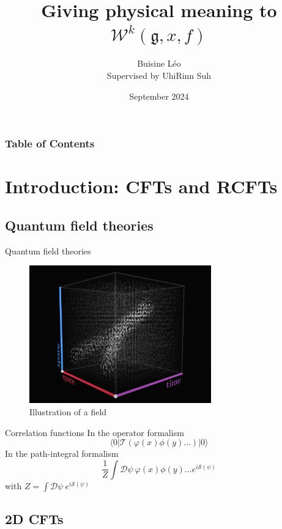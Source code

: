 \documentclass{beamer}
\title{Giving physical meaning to $\mathcal{W}^k(\mathfrak{g}, x, f)$}
\author{Buisine Léo \\ Supervised by UhiRinn Suh}
\institute{\textit{Ecole Normale Superieure of Paris}\\ \textit{Seoul National University}}
\date{September 2024}
\begin{document}
\frame{\titlepage}

\begin{frame}
\frametitle{Table of Contents}
\tableofcontents
\end{frame}


\section{Introduction: CFTs and RCFTs}
\subsection{Quantum field theories}


\begin{frame}{Quantum field theories}
    \begin{figure}
      \centering
          \includegraphics[width=0.7\textwidth]{qft.png}
          \caption{Illustration of a field}
      \end{figure}
\end{frame}


\begin{frame}{Correlation functions}
    In the operator formalism
    \begin{equation}
        \langle 0 | \mathcal{T}\left(\varphi(x) \phi(y)\dots\right) |0\rangle
    \end{equation}
    In the path-integral formalism
    \begin{equation}
        \frac{1}{Z}\int \mathcal{D}\psi ~ \varphi(x)\phi(y)\dots e^{i\mathcal{S}(\psi)}
    \end{equation}
    with $Z = \int \mathcal{D}\psi ~ e^{i\mathcal{S}(\psi)}$
\end{frame}


\subsection{2D CFTs}
\end{document}
